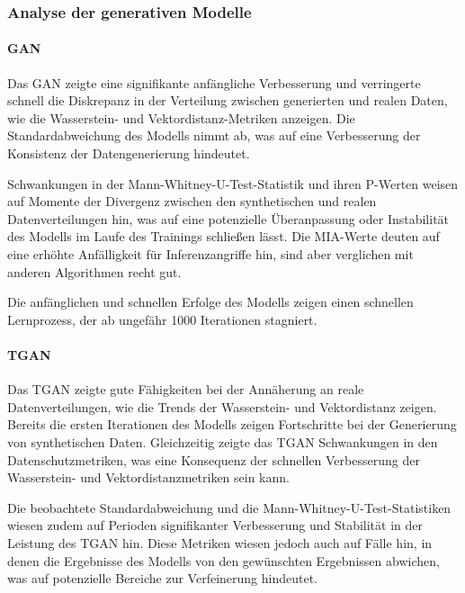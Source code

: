 \subsubsection{Analyse der generativen Modelle}

\paragraph{\textbf{GAN}}
Das GAN zeigte eine signifikante anfängliche Verbesserung und verringerte schnell die Diskrepanz in der Verteilung zwischen generierten und realen Daten, wie die Wasserstein- und Vektordistanz-Metriken anzeigen.
Die Standardabweichung des Modells nimmt ab, was auf eine Verbesserung der Konsistenz der Datengenerierung hindeutet.

Schwankungen in der Mann-Whitney-U-Test-Statistik und ihren P-Werten weisen auf Momente der Divergenz zwischen den synthetischen und realen Datenverteilungen hin, was auf eine potenzielle Überanpassung oder
Instabilität des Modells im Laufe des Trainings schließen lässt. Die \ac{MIA}-Werte deuten auf eine erhöhte Anfälligkeit für Inferenzangriffe hin, sind aber verglichen mit anderen Algorithmen recht gut.

Die anfänglichen und schnellen Erfolge des Modells zeigen einen schnellen Lernprozess, der ab ungefähr 1000 Iterationen stagniert.


\paragraph{\textbf{TGAN}}
Das TGAN zeigte gute Fähigkeiten bei der Annäherung an reale Datenverteilungen, wie die Trends der Wasserstein- und Vektordistanz zeigen. Bereits die ersten Iterationen des Modells zeigen Fortschritte bei der
Generierung von synthetischen Daten. Gleichzeitig zeigte das TGAN Schwankungen in den Datenschutzmetriken, was eine Konsequenz der schnellen Verbesserung der Wasserstein- und Vektordistanzmetriken sein kann.

Die beobachtete Standardabweichung und die Mann-Whitney-U-Test-Statistiken wiesen zudem auf Perioden signifikanter Verbesserung und Stabilität in der Leistung des TGAN hin. Diese Metriken wiesen jedoch auch auf
Fälle hin, in denen die Ergebnisse des Modells von den gewünschten Ergebnissen abwichen, was auf potenzielle Bereiche zur Verfeinerung hindeutet.


